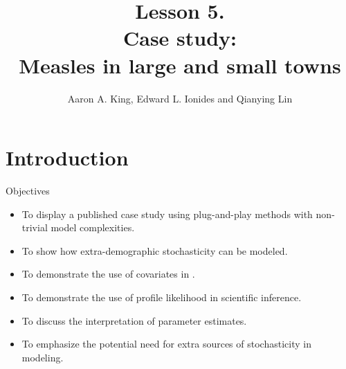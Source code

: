

\newcommand\CHAPTER{5}
\title{Lesson \CHAPTER.\\Case study:\\Measles in large and small towns}
\author{Aaron A. King, Edward L. Ionides and Qianying Lin}












\maketitle



\section{Introduction}

\begin{frame}{Objectives}
  \begin{itemize}
  \item To display a published case study using plug-and-play methods with non-trivial model complexities.
  \item To show how extra-demographic stochasticity can be modeled.
  \item To demonstrate the use of covariates in .
  \item To demonstrate the use of profile likelihood in scientific inference.
  \item To discuss the interpretation of parameter estimates.
  \item To emphasize the potential need for extra sources of stochasticity in modeling.
  \end{itemize}
\end{frame}


